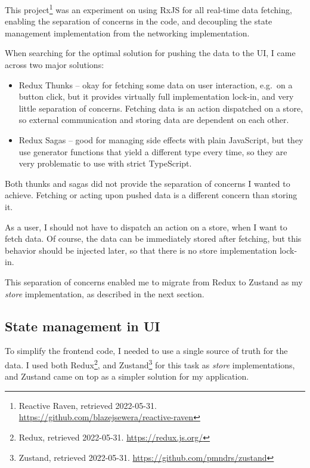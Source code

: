This project\footnote{Reactive Raven, retrieved 2022-05-31.
\url{https://github.com/blazejsewera/reactive-raven}} was an
experiment on using RxJS for all real-time data fetching, enabling the
separation of concerns in the code, and decoupling the state management
implementation from the networking implementation.

When searching for the optimal solution for pushing the data to the UI,
I came across two major solutions:

\begin{itemize}
  \item
    Redux Thunks -- okay for fetching some data on user interaction,
    e.g.~on a button click, but it provides virtually full implementation
    lock-in, and very little separation of concerns. Fetching data is an
    action dispatched on a store, so external communication and storing
    data are dependent on each other.
  \item
    Redux Sagas -- good for managing side effects with plain JavaScript,
    but they use generator functions that yield a different type every
    time, so they are very problematic to use with strict TypeScript.
\end{itemize}

Both thunks and sagas did not provide the separation of concerns I
wanted to achieve. Fetching or acting upon pushed data is a different
concern than storing it.

As a user, I should not have to dispatch an action on a store, when I
want to fetch data. Of course, the data can be immediately stored after
fetching, but this behavior should be injected later, so that there is
no store implementation lock-in.

This separation of concerns enabled me to migrate from Redux to Zustand
as my \emph{store} implementation, as described in the next section.

\subsection{State management in UI}\label{state-management-in-ui}

To simplify the frontend code, I needed to use a single source of truth
for the data. I used both Redux\footnote{Redux, retrieved 2022-05-31.
\url{https://redux.js.org/}}, and Zustand\footnote{Zustand, retrieved
2022-05-31. \url{https://github.com/pmndrs/zustand}} for this task as
\emph{store} implementations, and Zustand came on top as a simpler
solution for my application.

